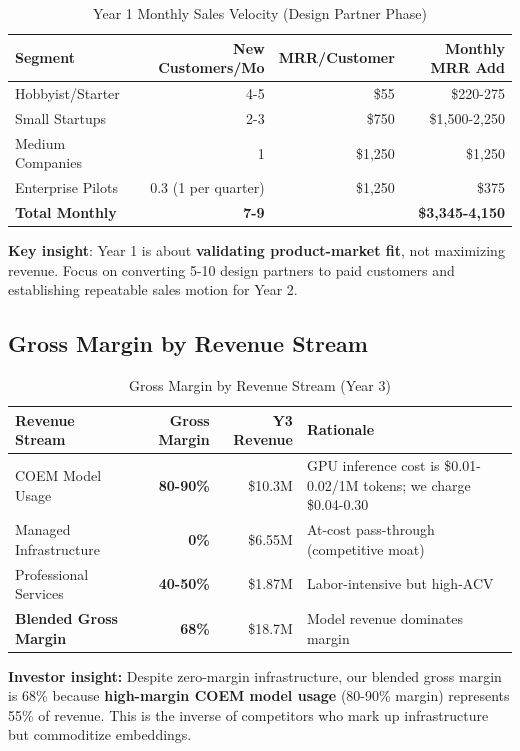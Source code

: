 \begin{table}[ht]
\centering
\small
\begin{tabular}{|l|r|r|r|}
\hline
\textbf{Segment} & \textbf{New Customers/Mo} & \textbf{MRR/Customer} & \textbf{Monthly MRR Add} \\
\hline
Hobbyist/Starter & 4-5 & \$55 & \$220-275 \\
Small Startups & 2-3 & \$750 & \$1,500-2,250 \\
Medium Companies & 1 & \$1,250 & \$1,250 \\
Enterprise Pilots & 0.3 (1 per quarter) & \$1,250 & \$375 \\
\hline
\textbf{Total Monthly} & \textbf{7-9} & & \textbf{\$3,345-4,150} \\
\hline
\end{tabular}
\caption{Year 1 Monthly Sales Velocity (Design Partner Phase)}
\end{table}

\textbf{Key insight}: Year 1 is about \textbf{validating product-market fit}, not maximizing revenue. Focus on converting 5-10 design partners to paid customers and establishing repeatable sales motion for Year 2.

\subsection{Gross Margin by Revenue Stream}

\begin{table}[ht]
\centering
\small
\begin{tabular}{|l|r|r|p{5cm}|}
\hline
\textbf{Revenue Stream} & \textbf{Gross Margin} & \textbf{Y3 Revenue} & \textbf{Rationale} \\
\hline
COEM Model Usage & \textbf{80-90\%} & \$10.3M & GPU inference cost is \$0.01-0.02/1M tokens; we charge \$0.04-0.30 \\
\hline
Managed Infrastructure & \textbf{0\%} & \$6.55M & At-cost pass-through (competitive moat) \\
\hline
Professional Services & \textbf{40-50\%} & \$1.87M & Labor-intensive but high-ACV \\
\hline
\textbf{Blended Gross Margin} & \textbf{68\%} & \$18.7M & Model revenue dominates margin \\
\hline
\end{tabular}
\caption{Gross Margin by Revenue Stream (Year 3)}
\end{table}

\textbf{Investor insight:} Despite zero-margin infrastructure, our blended gross margin is 68\% because \textbf{high-margin COEM model usage} (80-90\% margin) represents 55\% of revenue. This is the inverse of competitors who mark up infrastructure but commoditize embeddings.

